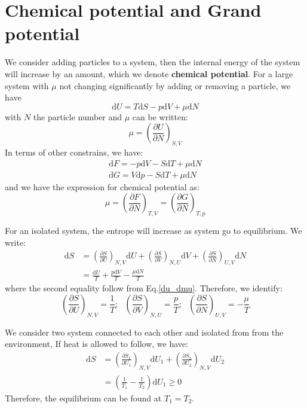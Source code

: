 \documentclass{article}
\newcommand{\pfrac}[2]{\frac{\partial #1}{\partial #2}}
\newcommand{\dnor}{\text{d}}
\begin{document}
\section{Chemical potential and Grand potential}
We consider adding particles to a system, then the internal energy of the system will
increase by an amount, which we denote \textbf{chemical potential}. For a large system
with $\mu$ not changing significantly by adding or removing a particle, we have
\begin{equation}
    \dnor U = T \dnor S - p \dnor V + \mu \dnor N \label{du_dmu}
\end{equation}
with $N$ the particle number and $\mu$ can be written:
\begin{equation}
    \mu = \left( \pfrac{U}{N} \right)_{S,V}
\end{equation}
In terms of other constrains, we have:
\begin{gather}
    \dnor F = -p \dnor V - S \dnor T + \mu \dnor N \\
    \dnor G = V \dnor p - S \dnor T + \mu \dnor N
\end{gather}
and we have the expression for chemical potential as:
\begin{equation}
    \mu = \left( \pfrac{F}{N} \right)_{T,V} = \left( \pfrac{G}{N} \right)_{T,p}
\end{equation}

For an isolated system, the entrope will increase as system go to equilibrium. 
We write:
\begin{align}
    \dnor S &= \left( \pfrac{S}{U} \right)_{N,V} \dnor U + 
              \left( \pfrac{S}{V} \right)_{N,U} \dnor V + 
              \left( \pfrac{S}{N} \right)_{U,V} \dnor N \\
            &= \frac{\dnor U}{T} + \frac{p \dnor V}{T} - \frac{\mu \dnor N}{T}
\end{align}
where the second equality follow from Eq.\ref{du_dmu}. 
Therefore, we identify:
\begin{equation}
    \left( \pfrac{S}{U} \right)_{N,V} = \frac{1}{T}; \ \ \
    \left( \pfrac{S}{V} \right)_{N,U} = \frac{p}{T}; \ \ \
    \left( \pfrac{S}{N} \right)_{U,V} =-\frac{\mu}{T}
\end{equation}

We consider two system connected to each other and isolated from 
from the environment, If heat is allowed to follow, we have:
\begin{align}
    \dnor S &= \left( \pfrac{S_1}{U_1} \right)_{N,V} \dnor U_1 + \left( \pfrac{S_2}{U_2} \right)_{N,V} \dnor U_2 \\
        &= \left( \frac{1}{T_1} - \frac{1}{T_2} \right) \dnor U_1 \ge 0
\end{align}
Therefore, the equilibrium can be found at $T_1 = T_2$.
\end{document}
